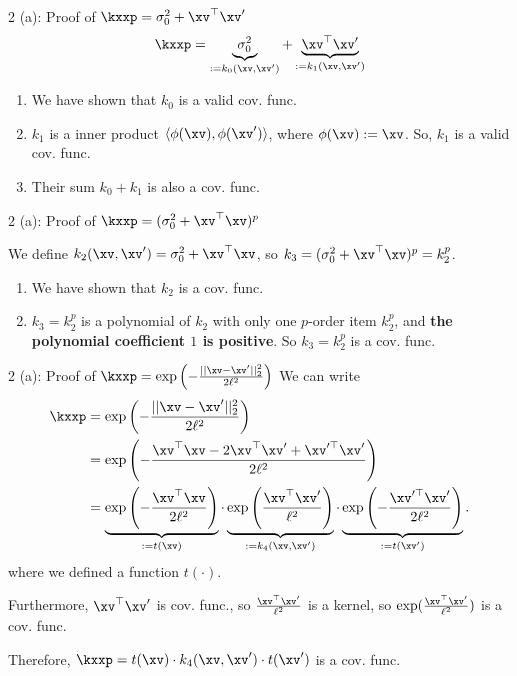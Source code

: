 \documentclass[aspectratio=169]{beamer}
\newcommand{\xvp}{\xv^\prime}
\begin{document}
\begin{frame}{2 (a): Proof of $\kxxp = \sigma_0^2 + \xv^\top \xvp$}
	\begin{align*}
		\kxxp = \underbrace{\sigma_0^2}_{:= k_0(\xv, \xvp)} + \underbrace{\xv^\top \xvp}_{:= k_1(\xv, \xvp)}
	\end{align*}
	\begin{enumerate}
		\item We have shown that $k_0$ is a valid cov. func.
		\item $k_1$ is a inner product $\langle \phi(\xv), \phi(\xvp) \rangle$, where $\phi(\xv) := \xv$. So, $k_1$ is a valid cov. func.
		\item Their sum $k_0 + k_1$ is also a cov. func.
	\end{enumerate}
\end{frame}

\begin{frame}{2 (a): Proof of $\kxxp = (\sigma_0^2 + \xv^\top \xv)^p$}
	
	We define $k_2(\xv, \xvp) =\sigma_0^2 + \xv^\top \xv$, so $k_3 = (\sigma_0^2 + \xv^\top \xv)^p = k_2^p$.
	
	\begin{enumerate}
		\item We have shown that $k_2$ is a cov. func.
		\item $k_3 = k_2^p$ is a polynomial of $k_2$ with only one $p$-order item $k_2^p$, and \textbf{the polynomial coefficient $1$ is positive}. So $k_3 = k_2^p$ is a cov. func.
	\end{enumerate}
\end{frame}

\begin{frame}{2 (a): Proof of $\kxxp = \exp\left(- \frac{||\xv - \xvp||_2^2}{2 \ell^2}\right)$}
\small
	We can write
	\begin{align*}
		\kxxp &= \exp\left(- \frac{||\xv - \xvp||_2^2}{2 \ell^2}\right) \\
		&=\exp \left( - \frac{\xv^\top \xv - 2 \xv^\top \xvp + \xv^{\prime \top} \xvp}{2 \ell^2} \right) \\
		&= \underbrace{\exp \left(-\frac{\xv^\top \xv}{2 \ell^2} \right)}_{:= t(\xv)}\cdot 
		\underbrace{\exp \left(\frac{\xv^\top \xvp}{\ell^2} \right)}_{:=k_4(\xv, \xvp)} \cdot \underbrace{\exp \left( - \frac{\xv^{\prime \top} \xvp}{2 \ell^2} \right)}_{:= t(\xvp)}.\\ 
	\end{align*}
	where we defined a function $t(\cdot)$.
	
	Furthermore, $\xv^\top \xvp$ is cov. func., so $\frac{\xv^\top \xvp}{\ell^2}$ is a kernel, so $\exp(\frac{\xv^\top \xvp}{\ell^2})$ is a cov. func. 
	
	Therefore, $\kxxp = t(\xv) \cdot k_4(\xv, \xvp) \cdot t(\xvp)$ is a cov. func.
\end{frame}
\end{document}
